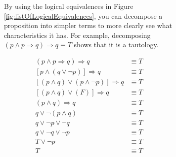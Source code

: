 \documentclass[12pt]{article}
\begin{document}
\begin{example}
  \begin{figure}[H]
    \centering
    \begin{subfigure}[H]{0.5\textwidth}
      By using the logical equivalences in Figure \ref{fig:listOfLogicalEquivalences}, you
      can decompose a proposition into simpler terms to more clearly see what characteristics
      it has. For example, decomposing $(p \land p \Rightarrow q) \Rightarrow q \equiv T$
      shows that it is a tautology.
    \end{subfigure}
    \begin{subfigure}[H]{0.4\textwidth}
      \centering
        \begin{align*}
          (p \land p \Rightarrow q) \Rightarrow q &\equiv T \\
          [p \land (q \lor \neg p)] \Rightarrow q &\equiv T \\
          [(p \land q) \lor (p \land \neg p)] \Rightarrow q &\equiv T \\
          [(p \land q) \lor (F)] \Rightarrow q &\equiv T \\
          (p \land q) \Rightarrow q &\equiv T \\
          q \lor \neg(p \land q) &\equiv T \\
          q \lor \neg p \lor \neg q &\equiv T \\
          q \lor \neg q \lor \neg p &\equiv T \\
          T \lor \neg p &\equiv T \\
          T &\equiv T
        \end{align*}
    \end{subfigure}
  \end{figure}
\end{example}
\end{document}

